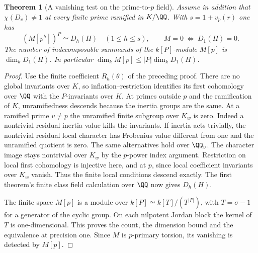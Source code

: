 \documentclass[a4paper,11pt]{article}
\newtheorem{theorem}[proposition]{Theorem}
\theoremstyle{definition}
\theoremstyle{remark}
\numberwithin{equation}{section}
\begin{document}
\begin{theorem}[A vanishing test on the prime-to-\(p\) field]
\leavevmode\label{thm:cyclicdescent661}
Assume in addition that \(\chi(D_v)\ne1\) at every finite prime
ramified in \(K/\QQ\). With \(s=1+v_p(r)\) one has
\[
                  (M[p^h])^P\simeq D_h(H)\quad(1\le h\le s),
       \qquad       M=0\ \Longleftrightarrow\ D_1(H)=0.
\]
The number of indecomposable summands of the \(k[P]\)-module
\(M[p]\) is \(\dim_k D_1(H)\). In particular
\(\dim_k M[p]\le |P|\dim_k D_1(H)\).
\end{theorem}
\begin{proof}
Use the finite coefficient \(R_h(\theta)\) of the preceding
proof. There are no global invariants over \(K\), so
inflation--restriction identifies its first cohomology over
\(\QQ\) with the \(P\)-invariants over \(K\). At primes
outside \(p\) and the ramification of \(K\), unramifiedness
descends because the inertia groups are the same. At a ramified
prime \(v\ne p\) the unramified finite subgroup over \(K_w\)
is zero. Indeed a nontrivial residual inertia value kills the
invariants. If inertia acts trivially, the nontrivial residual
local character has Frobenius value different from one and the
unramified quotient is zero. The same alternatives hold over
\(\QQ_v\). The character image stays nontrivial over \(K_w\)
by the \(p\)-power index argument. Restriction on local first
cohomology is injective here, and at \(p\), since local
coefficient invariants over \(K_w\) vanish. Thus the finite
local conditions descend exactly. The first theorem's finite
class field calculation over \(\QQ\) now gives \(D_h(H)\).

The finite space \(M[p]\) is a module over
\(k[P]\simeq k[T]/(T^{|P|})\), with \(T=\sigma-1\) for a
generator of the cyclic group. On each nilpotent Jordan block
the kernel of \(T\) is one-dimensional. This proves the count,
the dimension bound and the equivalence at precision one.
Since \(M\) is \(p\)-primary torsion, its vanishing is detected
by \(M[p]\).
\end{proof}
\end{document}

